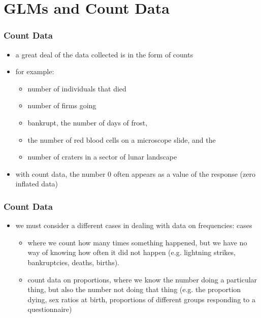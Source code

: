\section{GLMs and Count Data}

\begin{frame}[fragile]\frametitle{Count Data}
\begin{itemize}
\item a great deal of the data collected is in the form of counts
\item for example:
  \begin{itemize}
  \item number of individuals that died
  \item number of firms going
  \item bankrupt, the number of days of frost, 
  \item the number of red blood cells on a microscope slide, and the 
  \item number of craters in a sector of lunar landscape
  \end{itemize}
\item with count data, the number 0 often appears as a value of the response (zero inflated data)
\end{itemize}
\end{frame}

\begin{frame}[fragile]\frametitle{Count Data}
\begin{itemize}
\item we must consider a different cases in dealing with data on frequencies: cases
  \begin{itemize}
  \item   where we count how many
times something happened, but we have no way of knowing how often it did not happen
(e.g. lightning strikes, bankruptcies, deaths, births). 
\item count data on proportions, where we know the number doing a particular thing, but also the number
not doing that thing (e.g. the proportion dying, sex ratios at birth, proportions of different
groups responding to a questionnaire)
  \end{itemize}
\end{itemize}
\end{frame}

